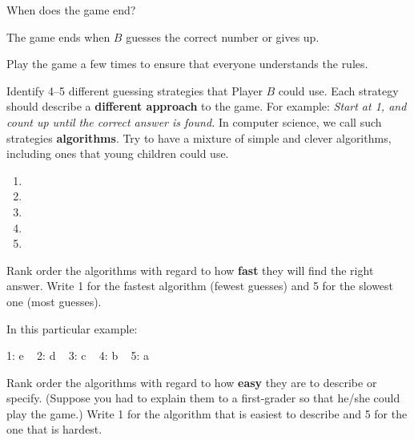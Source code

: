 \Q When does the game end?

\begin{answer}[2em]
The game ends when $B$ guesses the correct number or gives up.
\end{answer}


\Q Play the game a few times to ensure that everyone understands the rules.

\vspace{1ex}




\Q Identify 4--5 different guessing strategies that Player $B$ could use.
Each strategy should describe a \textbf{different approach} to the game.
For example: \textit{Start at 1, and count up until the correct answer is found.}
In computer science, we call such strategies \textbf{algorithms}.
Try to have a mixture of simple and clever algorithms, including ones that young children could use.

\begin{enumerate}
\item {}
\item {}
\item {}
\item {}
\item {}
\end{enumerate}


\Q Rank order the algorithms with regard to how \textbf{fast} they will find the right answer.
Write 1 for the fastest algorithm (fewest guesses) and 5 for the slowest one (most guesses).

\begin{answer}
In this particular example:

1: e ~ 2: d ~ 3: c ~ 4: b ~ 5: a
\end{answer}


\Q Rank order the algorithms with regard to how \textbf{easy} they are to describe or specify.
(Suppose you had to explain them to a first-grader so that he/she could play the game.)
Write 1 for the algorithm that is easiest to describe and 5 for the one that is hardest.

